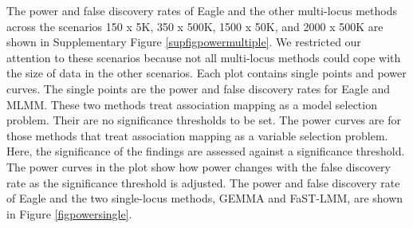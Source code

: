 \documentclass{article}
\begin{document}
The power and false discovery rates of Eagle and the other multi-locus methods across the scenarios 150 x 5K, 350 x 500K, 1500 x 50K, and 2000 x 500K are shown in Supplementary Figure \ref{supfigpowermultiple}.  We restricted our attention to these scenarios because not all 
multi-locus methods could cope with the size of data in the other scenarios. 
  Each plot contains 
single points and power curves. The single points are the power and false discovery rates for Eagle and MLMM.
These two methods treat association mapping as a model selection problem. Their are no significance thresholds to be set. 
The power curves are for those methods that treat association mapping as a variable selection problem. Here, the 
significance of the findings are assessed against a significance threshold. The power curves in the plot show how power changes with 
the false discovery rate as the significance threshold  is adjusted. 
The power and false discovery rate of Eagle and the two single-locus methods, GEMMA and FaST-LMM,  are shown in
 Figure \ref{figpowersingle}. 
\end{document}
